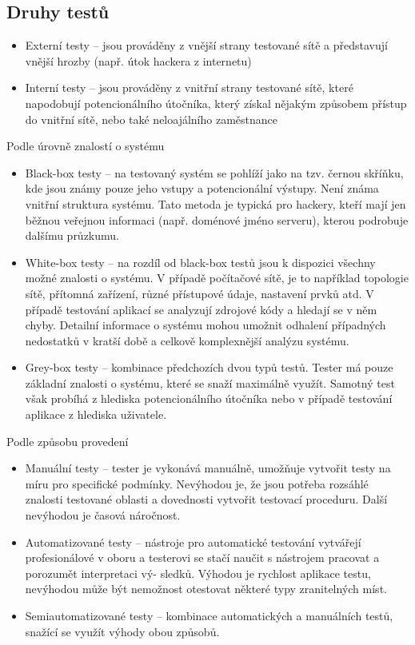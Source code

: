 \documentclass{article}
\begin{document}
\begin{large}
\section{Druhy testů}
\begin{itemize}  
\item Externí testy – jsou prováděny z vnější strany testované sítě a představují vnější hrozby
(např. útok hackera z internetu)
\item Interní testy – jsou prováděny z vnitřní strany testované sítě, které napodobují potencionálního
útočníka, který získal nějakým způsobem přístup do vnitřní sítě, nebo také
neloajálního zaměstnance
\end{itemize}
Podle úrovně znalostí o systému
\begin{itemize}  
\item Black-box testy – na testovaný systém se pohlíží jako na tzv. černou skříňku, kde jsou
známy pouze jeho vstupy a potencionální výstupy. Není známa vnitřní struktura systému.
Tato metoda je typická pro hackery, kteří mají jen běžnou veřejnou informaci (např. doménové
jméno serveru), kterou podrobuje dalšímu průzkumu.
\item White-box testy – na rozdíl od black-box testů jsou k dispozici všechny možné znalosti
o systému. V případě počítačové sítě, je to například topologie sítě, přítomná zařízení,
různé přístupové údaje, nastavení prvků atd. V případě testování aplikací se analyzují
zdrojové kódy a hledají se v něm chyby. Detailní informace o systému mohou umožnit
odhalení případných nedostatků v kratší době a celkově komplexnější analýzu systému.
\item Grey-box testy – kombinace předchozích dvou typů testů. Tester má pouze základní
znalosti o systému, které se snaží maximálně využít. Samotný test však probíhá z hlediska
potencionálního útočníka nebo v případě testování aplikace z hlediska uživatele.
\end{itemize}
Podle způsobu provedení
\begin{itemize}  
\item Manuální testy – tester je vykonává manuálně, umožňuje vytvořit testy na míru pro specifické
podmínky. Nevýhodou je, že jsou potřeba rozsáhlé znalosti testované oblasti a dovednosti
vytvořit testovací proceduru. Další nevýhodou je časová náročnost.
\item Automatizované testy – nástroje pro automatické testování vytvářejí profesionálové
v oboru a testerovi se stačí naučit s nástrojem pracovat a porozumět interpretaci vý-
sledků. Výhodou je rychlost aplikace testu, nevýhodou může být nemožnost otestovat
některé typy zranitelných míst.
\item Semiautomatizované testy – kombinace automatických a manuálních testů, snažící se
využít výhody obou způsobů.
\end{itemize}

\end{large}
\end{document}
